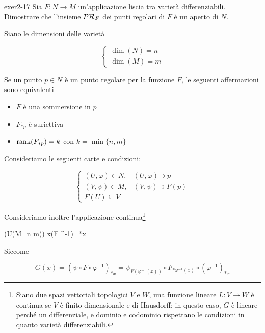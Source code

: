 {exer2-17}
{
Sia $ F : N \to M $ un'applicazione liscia tra varietà differenziabili. Dimostrare che l'insieme $ \mathcal{PR}_{F} $ dei punti regolari di $ F $ è un aperto di $ N $.
}
{

Siano le dimensioni delle varietà

\begin{equation}
	\begin{cases}
		\dim(N) = n \\
		\dim(M) = m
	\end{cases}
\end{equation}

Se un punto $ p \in N $ è un punto regolare per la funzione $ F $, le seguenti affermazioni sono equivalenti

\begin{itemize}
	\item $ F $ è una sommersione in $ p $
	
	\item $ F_{*p} $ è suriettiva
	
	\item  $ \rank(F_{*p}) = k $ con $ k = \min \{n,m\} $
\end{itemize}

Consideriamo le seguenti carte e condizioni:

\begin{equation}
	\begin{cases}
		(U,\varphi) \in N, & (U,\varphi) \ni p \\
		(V,\psi) \in M, & (V,\psi) \ni F(p) \\
		F(U) \subseteq V
	\end{cases}
\end{equation}

Consideriamo inoltre l'applicazione continua\footnote{%
	Siano due spazi vettoriali topologici $ V $ e $ W $, una funzione lineare $ L : V \to W $ è continua se $ V $ è finito dimensionale e di Hausdorff; in questo caso, $ G $ è lineare perché un differenziale, e dominio e codominio rispettano le condizioni in quanto varietà differenziabili.%
}

	{\varphi(U)}{M_{n \times m}(\R)}
	{x}{(\psi \circ F \circ \varphi^{-1})_{*x}}

Siccome

\begin{equation}
	G(x) = (\psi \circ F \circ \varphi^{-1})_{*x} %
	= \psi_{F(\varphi^{-1}(x))} \circ F_{*\varphi^{-1}(x)} \circ (\varphi^{-1})_{*x}
\end{equation}

}
